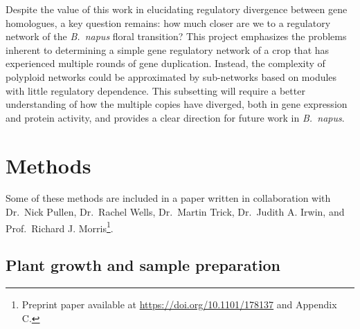 \documentclass[12pt,]{book}
\begin{document}
Despite the value of this work in elucidating regulatory divergence
between gene homologues, a key question remains: how much closer are we
to a regulatory network of the \emph{B.~napus} floral transition? This
project emphasizes the problems inherent to determining a simple gene
regulatory network of a crop that has experienced multiple rounds of
gene duplication. Instead, the complexity of polyploid networks could be
approximated by sub-networks based on modules with little regulatory
dependence. This subsetting will require a better understanding of how
the multiple copies have diverged, both in gene expression and protein
activity, and provides a clear direction for future work in
\emph{B.~napus}.

\chapter{Methods}\label{chapter:materialsandmethods}

Some of these methods are included in a paper written in collaboration
with Dr.~Nick Pullen, Dr.~Rachel Wells, Dr.~Martin Trick, Dr.~Judith A.
Irwin, and Prof.~Richard J. Morris\footnote{Preprint paper available at
  \url{https://doi.org/10.1101/178137} and Appendix C.}.

\section{Plant growth and sample
preparation}\label{plant-growth-and-sample-preparation}
\end{document}
